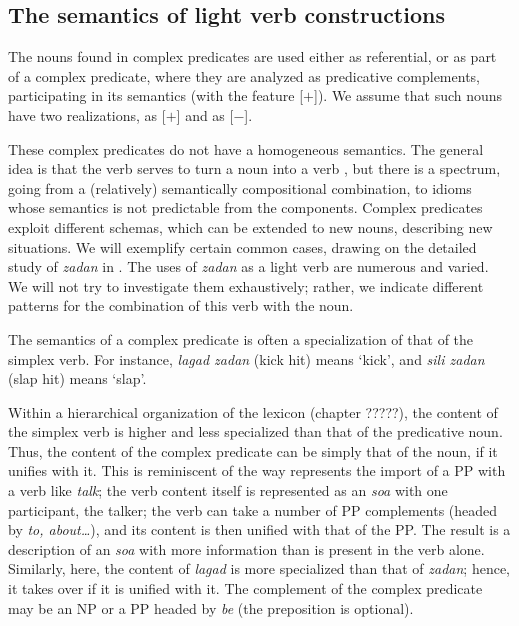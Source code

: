 \documentclass[output=paper
                ,modfonts
                ,nonflat
	        ,collection
	        ,collectionchapter
	        ,collectiontoclongg
 	        ,biblatex
                ,babelshorthands
                ,newtxmath
                ,draftmode
                ,colorlinks, citecolor=brown
]{./langsci/langscibook}
\begin{document}
{\subsection{The semantics of light verb constructions}\label{GSsection5.3}

The nouns found in complex predicates are used either as referential, or as part of a complex predicate, where they are analyzed as predicative complements, participating in its semantics (with the feature [\prd $+$]). We assume that such nouns have two realizations, as [\prd $+$] and as [\prd $-$]. 

These complex predicates do not have a homogeneous semantics. The general idea is that the verb serves to turn a noun into a verb \citep{bonami2010persian}, but there is a spectrum, going from a (relatively) semantically compositional combination, to idioms whose semantics is not predictable from the components. Complex predicates exploit different schemas, which can be extended to new nouns, describing new situations. We will exemplify certain common cases, drawing on the detailed study of \emph{zadan} in \cite{pollet2012grammaire}. The uses of \emph{zadan} as a light verb are numerous and varied. We will not try to investigate them exhaustively; rather, we indicate different patterns for the combination of this verb with the noun. 

The semantics of a complex predicate is often a specialization of that of the simplex verb. For instance, \emph{lagad zadan} (kick hit) means `kick', and \emph{sili zadan} (slap hit) means `slap'. 

\z

Within a hierarchical organization of the lexicon (chapter ?????), the content of the simplex verb is higher and less specialized than that of the predicative noun. Thus, the content of the complex predicate can be simply that of the noun, if it unifies with it. This is reminiscent of the way \cite{Wechsler1995c} represents the import of a PP with a verb like \emph{talk}; the verb content itself is represented as an \emph{soa} with one participant, the talker; the verb can take a number of PP complements (headed by \emph{to, about…}), and its content is then unified with that of the PP. The result is a description of an \emph{soa} with more information than is present in the verb alone. Similarly, here, the content of \emph{lagad} is more specialized than that of \emph{zadan}; hence, it takes over if it is unified with it. The complement of the complex predicate may be an NP or a PP headed by \emph{be} (the preposition is optional). 

}
\end{document}
